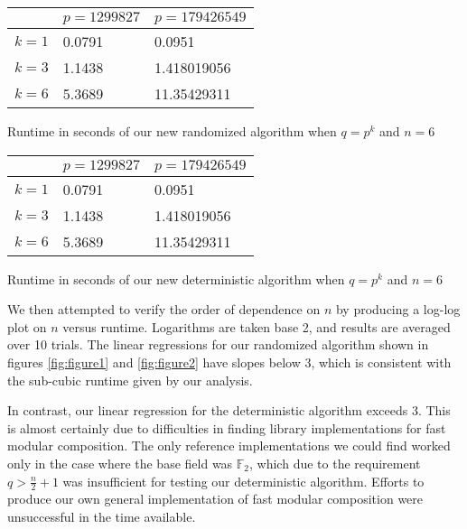 \documentclass{acmart}
\theoremstyle{remark}
\numberwithin{equation}{section}
\begin{document}
\begin{center}
\begin{tabular}{ | m{2cm} | m{3cm}| m{3cm} | } 
\hline
 & $p = 1299827$ & $p = 179426549 $ \\ 
\hline
$k = 1$ & 0.0791 & 0.0951 \\ 
\hline
$k = 3$ & 1.1438 & 1.418019056\\
\hline 

$k = 6$ &5.3689 & 11.35429311\\

\hline
\end{tabular}
\end{center}
\begin{table}[h!]
  \centering
  \caption{Runtime in seconds of our new randomized algorithm when $q = p^k$ and $n = 6$}
  \label{tab:table1}
\end{table}


\begin{center}
\begin{tabular}{ | m{2cm} | m{3cm}| m{3cm} | } 
\hline
 & $p = 1299827$ & $p = 179426549 $ \\ 
\hline
$k = 1$ & 0.0791 & 0.0951 \\ 
\hline
$k = 3$ & 1.1438 & 1.418019056\\
\hline 

$k = 6$ &5.3689 & 11.35429311\\

\hline
\end{tabular}
\end{center}
\begin{table}[h!]
  \centering
  \caption{Runtime in seconds of our new deterministic algorithm when $q = p^k$ and $n = 6$}
  \label{tab:table2}
\end{table}


We then attempted to verify the order of dependence on $n$ by producing a log-log plot on $n$ versus runtime. Logarithms are taken base 2, and results are averaged over 10 trials. The linear regressions for our randomized algorithm shown in figures \ref{fig:figure1} and \ref{fig:figure2} have slopes below 3, which is consistent with the sub-cubic runtime given by our analysis.

In contrast, our linear regression for the deterministic algorithm exceeds 3. This is almost certainly due to difficulties in finding library implementations for fast modular composition. The only reference implementations we could find worked only in the case where the base field was $\mathbb{F}_2$, which due to the requirement $q > \frac{n}{2} + 1$ was insufficient for testing our deterministic algorithm. Efforts to produce our own general implementation of fast modular composition were unsuccessful in the time available.
\end{document}
